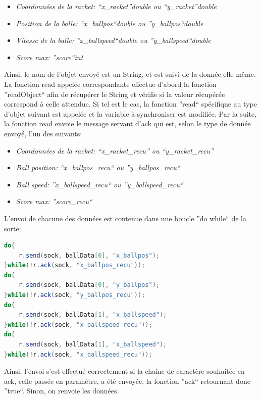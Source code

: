 \begin{itemize}
 \item \textit{Coordonnées de la racket: ``x\_racket''double ou ``y\_racket''double}
 \item \textit{Position de la balle: ``x\_ballpos``double ou ''y\_ballpos``double}
 \item \textit{Vitesse de la balle: ''x\_ballspeed``double ou ''y\_ballspeed``double}
 \item \textit{Score max: ''score``int}
\end{itemize}

Ainsi, le nom de l'objet envoyé est un String, et est suivi de la donnée elle-même. La fonction read appelée correspondante 
effectue d'abord la fonction ''readObject`` afin de récupérer le String et vérifie si la valeur récupérée correspond à 
celle attendue. Si tel est le cas, la fonction ''read`` spécifique au type d'objet suivant est appelée et la variable 
à synchroniser est modifiée. Par la suite, la fonction read envoie le message servant d'ack qui est, selon le type de donnée 
envoyé, l'un des suivants:

\begin{itemize}
 \item \textit{Coordonnées de la racket: ``x\_racket\_recu'' ou ``y\_racket\_recu''}
 \item \textit{Ball position: ``x\_ballpos\_recu`` ou ''y\_ballpos\_recu``}
 \item \textit{Ball speed: ''x\_ballspeed\_recu`` ou ''y\_ballspeed\_recu``}
 \item \textit{Score max: ''score\_recu``}
\end{itemize}

L'envoi de chacune des données est contenue dans une boucle ''do while`` de la sorte:

\begin{lstlisting}[language=Java]
do{
	r.send(sock, ballData[0], "x_ballpos");
}while(!r.ack(sock, "x_ballpos_recu"));
do{
	r.send(sock, ballData[0], "y_ballpos");
}while(!r.ack(sock, "y_ballpos_recu"));
do{
	r.send(sock, ballData[1], "x_ballspeed");
}while(!r.ack(sock, "x_ballspeed_recu"));
do{
	r.send(sock, ballData[1], "x_ballspeed");
}while(!r.ack(sock, "x_ballspeed_recu"));
\end{lstlisting}

Ainsi, l'envoi s'est effectué correctement si la chaîne de caractère souhaitée en ack, celle passée en paramètre, 
a été envoyée, la fonction ''ack`` retournant donc ''true``. Sinon, 
on renvoie les données.

